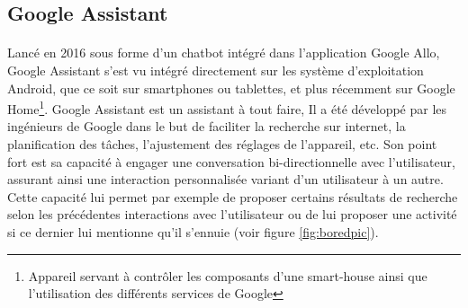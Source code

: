\subsection{Google Assistant}\label{googleass}
\paragraph{}
Lancé en 2016 sous forme d'un chatbot intégré dans l'application Google Allo,  Google Assistant s'est vu intégré directement sur les système d'exploitation Android, que ce soit sur smartphones ou tablettes, et plus récemment sur Google Home\footnote{Appareil servant à contrôler les composants d'une smart-house ainsi que l'utilisation des différents services de Google}. Google Assistant est un assistant à tout faire, Il a été développé par les ingénieurs de Google dans le but de faciliter la recherche sur internet, la planification des tâches, l'ajustement des réglages de l'appareil, etc. Son point fort est sa capacité à engager une conversation bi-directionnelle avec l'utilisateur, assurant ainsi une interaction personnalisée variant d'un utilisateur à un autre. Cette capacité lui permet par exemple de proposer certains résultats de recherche selon les précédentes interactions avec l'utilisateur ou de lui proposer une activité si ce dernier lui mentionne qu'il s'ennuie (voir figure \ref{fig:boredpic}).



